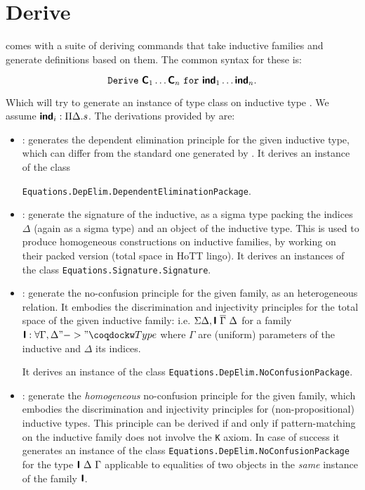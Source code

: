 \section{Derive}

\Equations comes with a suite of deriving commands that take inductive
families and generate definitions based on them. The common syntax for
these is:

\[\mathtt{Derive}~\textbf{\mbox{\textsf{C}}}_1 \ldots \textbf{\mbox{\textsf{C}}}_n~\mathtt{for}~\textbf{\mbox{\textsf{ind}}}_1 \ldots \textbf{\mbox{\textsf{ind}}}_n.\]

Which will try to generate an instance of type class  on
inductive type . We assume $\textbf{\mbox{\textsf{ind}}}_i : \Pi \Delta. s$.
The derivations provided by \Equations are:

\begin{itemize}
\item {}: generates the dependent
  elimination principle for the given inductive type, which can differ
  from the standard one generated by \Coq.
  It derives an instance of the class

  \texttt{Equations.DepElim.DependentEliminationPackage}.
\item {}: generate the signature of the inductive, as a
  sigma type packing the indices $\Delta$ (again as a sigma type) and
  an object of the inductive type. This is used to produce homogeneous
  constructions on inductive families, by working on their packed
  version (total space in HoTT lingo).
  It derives an instances of the class
  \texttt{Equations.Signature.Signature}.

\item {}: generate the no-confusion principle for the
  given family, as an heterogeneous relation. It embodies the
  discrimination and injectivity principles for the
  total space of the given inductive family: i.e.
  $\Sigma \Delta, \textbf{\mbox{\textsf{I}}}~{\overline \Gamma}~\Delta$ for a family
  $\ind{I} : \forall \Gamma, \Delta "->" \kw{Type}$ where $\Gamma$ are
  (uniform) parameters of the inductive and $\Delta$ its indices.

  It derives an instance of the class \texttt{Equations.DepElim.NoConfusionPackage}.

\item {}: generate the \emph{homogeneous} no-confusion
  principle for the given family, which embodies the discrimination and
  injectivity principles for (non-propositional) inductive types.
  This principle can be derived if and only if pattern-matching on the
  inductive family does not involve the \texttt{K} axiom.
  In case of success it generates an instance of the class
  \texttt{Equations.DepElim.NoConfusionPackage} for the type $\textbf{\mbox{\textsf{I}}}~
  \Delta~\Gamma$ applicable to equalities of two objects in the \emph{same}
  instance of the family $\textbf{\mbox{\textsf{I}}}$.


\end{itemize}

